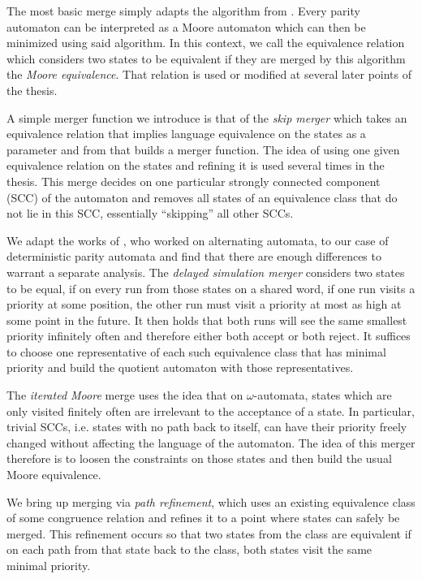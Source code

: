 The most basic merge simply adapts the algorithm from \cite{Hopcroft1971}. Every parity automaton can be interpreted as a Moore automaton which can then be minimized using said algorithm. In this context, we call the equivalence relation which considers two states to be equivalent if they are merged by this algorithm the \emph{Moore equivalence}. That relation is used or modified at several later points of the thesis.

A simple merger function we introduce is that of the \emph{skip merger} which takes an equivalence relation that implies language equivalence on the states as a parameter and from that builds a merger function. The idea of using one given equivalence relation on the states and refining it is used several times in the thesis. This merge decides on one particular strongly connected component (SCC) of the automaton and removes all states of an equivalence class that do not lie in this SCC, essentially \enquote{skipping} all other SCCs.

We adapt the works of \cite{FritzWilke06}, who worked on alternating automata, to our case of deterministic parity automata and find that there are enough differences to warrant a separate analysis. The \emph{delayed simulation merger} considers two states to be equal, if on every run from those states on a shared word, if one run visits a priority at some position, the other run must visit a priority at most as high at some point in the future. It then holds that both runs will see the same smallest priority infinitely often and therefore either both accept or both reject. It suffices to choose one representative of each such equivalence class that has minimal priority and build the quotient automaton with those representatives.

The \emph{iterated Moore} merge uses the idea that on $\omega$-automata, states which are only visited finitely often are irrelevant to the acceptance of a state. In particular, trivial SCCs, i.e. states with no path back to itself, can have their priority freely changed without affecting the language of the automaton. The idea of this merger therefore is to loosen the constraints on those states and then build the usual Moore equivalence.

We bring up merging via \emph{path refinement}, which uses an existing equivalence class of some congruence relation and refines it to a point where states can safely be merged. This refinement occurs so that two states from the class are equivalent if on each path from that state back to the class, both states visit the same minimal priority. 

